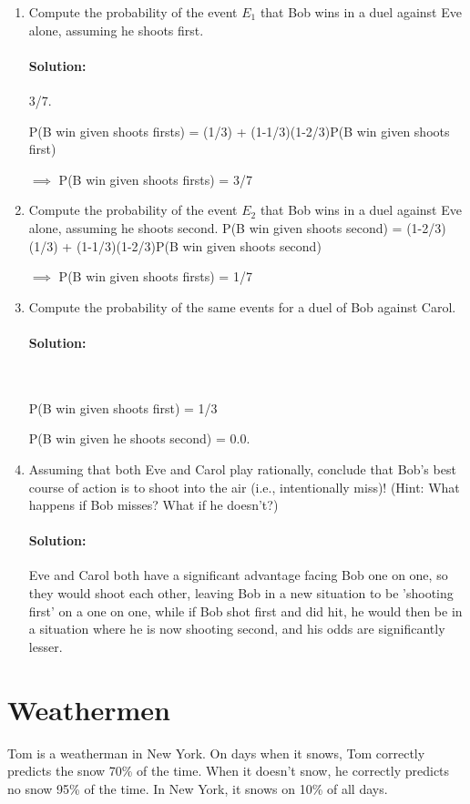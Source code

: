 \documentclass[11pt, notitlepage]{article}
\newcommand{\Question}[1]{\newpage\section{#1}}
\newenvironment{solution}{\paragraph{Solution:}}{\hfill}
\begin{document}
\begin{enumerate}[label=(\alph*)]





\item Compute the probability of the event $E_1$ that Bob wins in a duel against Eve alone, assuming he shoots first.
\begin{solution} 3/7.

	P(B win given shoots firsts) = (1/3) + (1-1/3)(1-2/3)P(B win given shoots first) 
	
	$\implies$ P(B win given shoots firsts) = 3/7
\end{solution}
\item Compute the probability of the event $E_2$ that Bob wins in a duel against Eve alone, assuming he shoots second.
	P(B win given shoots second) = (1-2/3)(1/3) + (1-1/3)(1-2/3)P(B win given shoots second) 
	
	$\implies$ P(B win given shoots firsts) = 1/7

\item Compute the  probability of the same events for a duel of Bob against Carol.
\begin{solution}\


	P(B win given shoots first) = 1/3
	
	P(B win given he shoots second) = 0.0.
\end{solution}

\item Assuming that both Eve and Carol play rationally, conclude that Bob's best course of action is to shoot into the air (i.e., intentionally miss)! (Hint: What happens if Bob misses? What if he  doesn't?)
\begin{solution}
	Eve and Carol both have a significant advantage facing Bob one on one, so they would shoot each other, leaving Bob in a new situation to be 'shooting first' on a one on one, while if Bob shot first and did hit, he would then be in a situation where he is now shooting second, and his odds are significantly lesser.
\end{solution}


\end{enumerate}



 

\Question{Weathermen}

Tom is a weatherman in New York. On days when it snows, Tom correctly predicts the snow 70\% of the time. When it doesn't snow, he correctly predicts no snow 95\% of the time. In New York, it snows on 10\% of all days.
\end{document}
